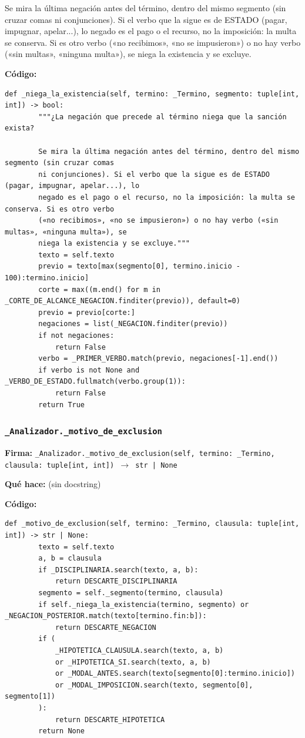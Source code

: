 \documentclass[11pt,a4paper]{article}
\begin{document}
Se mira la última negación antes del término, dentro del mismo segmento (sin cruzar comas
ni conjunciones). Si el verbo que la sigue es de ESTADO (pagar, impugnar, apelar...), lo
negado es el pago o el recurso, no la imposición: la multa se conserva. Si es otro verbo
(«no recibimos», «no se impusieron») o no hay verbo («sin multas», «ninguna multa»), se
niega la existencia y se excluye.

\textbf{Código:}
\begin{lstlisting}
def _niega_la_existencia(self, termino: _Termino, segmento: tuple[int, int]) -> bool:
        """¿La negación que precede al término niega que la sanción exista?

        Se mira la última negación antes del término, dentro del mismo segmento (sin cruzar comas
        ni conjunciones). Si el verbo que la sigue es de ESTADO (pagar, impugnar, apelar...), lo
        negado es el pago o el recurso, no la imposición: la multa se conserva. Si es otro verbo
        («no recibimos», «no se impusieron») o no hay verbo («sin multas», «ninguna multa»), se
        niega la existencia y se excluye."""
        texto = self.texto
        previo = texto[max(segmento[0], termino.inicio - 100):termino.inicio]
        corte = max((m.end() for m in _CORTE_DE_ALCANCE_NEGACION.finditer(previo)), default=0)
        previo = previo[corte:]
        negaciones = list(_NEGACION.finditer(previo))
        if not negaciones:
            return False
        verbo = _PRIMER_VERBO.match(previo, negaciones[-1].end())
        if verbo is not None and _VERBO_DE_ESTADO.fullmatch(verbo.group(1)):
            return False
        return True
\end{lstlisting}

\subsubsection*{\texttt{\_Analizador.\_motivo\_de\_exclusion}}
\textbf{Firma:} \texttt{\_Analizador.\_motivo\_de\_exclusion(self, termino: \_Termino, clausula: tuple[int, int]) $\rightarrow$ str | None}

\textbf{Qué hace:} (sin docstring)

\textbf{Código:}
\begin{lstlisting}
def _motivo_de_exclusion(self, termino: _Termino, clausula: tuple[int, int]) -> str | None:
        texto = self.texto
        a, b = clausula
        if _DISCIPLINARIA.search(texto, a, b):
            return DESCARTE_DISCIPLINARIA
        segmento = self._segmento(termino, clausula)
        if self._niega_la_existencia(termino, segmento) or _NEGACION_POSTERIOR.match(texto[termino.fin:b]):
            return DESCARTE_NEGACION
        if (
            _HIPOTETICA_CLAUSULA.search(texto, a, b)
            or _HIPOTETICA_SI.search(texto, a, b)
            or _MODAL_ANTES.search(texto[segmento[0]:termino.inicio])
            or _MODAL_IMPOSICION.search(texto, segmento[0], segmento[1])
        ):
            return DESCARTE_HIPOTETICA
        return None
\end{lstlisting}
\end{document}
